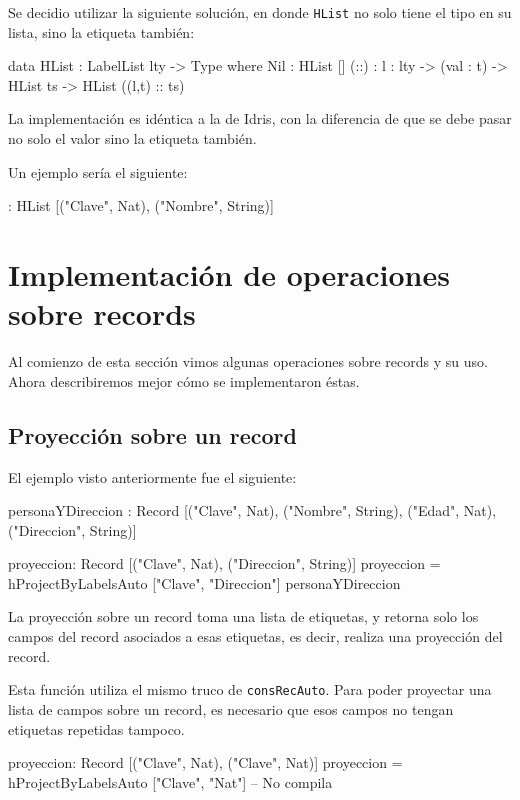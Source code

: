 Se decidio utilizar la siguiente solución, en donde \texttt{HList} no solo tiene el tipo en su lista, sino la etiqueta también:

\begin{code}
data HList : LabelList lty -> Type where
  Nil : HList []
  (::) : {l : lty} -> (val : t) -> HList ts -> 
    HList ((l,t) :: ts)
\end{code}

La implementación es idéntica a la de Idris, con la diferencia de que se debe pasar no solo el valor sino la etiqueta también.

Un ejemplo sería el siguiente:

\begin{code}
 : 
  HList [("Clave", Nat), ("Nombre", String)]
\end{code}


\section{Implementación de operaciones sobre records}

Al comienzo de esta sección vimos algunas operaciones sobre records y su uso. Ahora describiremos mejor cómo se implementaron éstas.

\subsection{Proyección sobre un record}

El ejemplo visto anteriormente fue el siguiente:

\begin{code}
personaYDireccion : Record [("Clave", Nat), ("Nombre", String), 
  ("Edad", Nat), ("Direccion", String)]

proyeccion: Record [("Clave", Nat), ("Direccion", String)]
proyeccion = hProjectByLabelsAuto ["Clave", "Direccion"] 
  personaYDireccion
\end{code}

La proyección sobre un record toma una lista de etiquetas, y retorna solo los campos del record asociados a esas etiquetas, es decir, realiza una proyección del record.

Esta función utiliza el mismo truco de \texttt{consRecAuto}. Para poder proyectar una lista de campos sobre un record, es necesario que esos campos no tengan etiquetas repetidas tampoco.

\begin{code}
proyeccion: Record [("Clave", Nat), ("Clave", Nat)]
proyeccion = hProjectByLabelsAuto ["Clave", "Nat"]
-- No compila 
\end{code}

